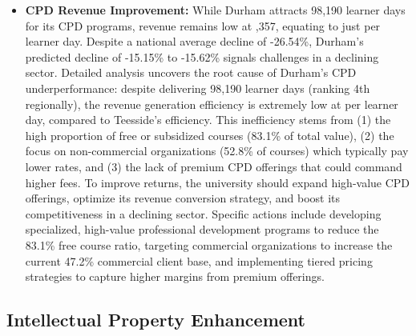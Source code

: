 \documentclass[journal,onecolumn, 10pt,draftclsnofoot]{IEEEtran}
\begin{document}
\begin{itemize}
    \item \textbf{CPD Revenue Improvement:} While Durham attracts 98,190 learner days for its CPD programs, revenue remains low at ,357, equating to just  per learner day. Despite a national average decline of -26.54\%, Durham's predicted decline of -15.15\% to -15.62\% signals challenges in a declining sector. Detailed analysis uncovers the root cause of Durham's CPD underperformance: despite delivering 98,190 learner days (ranking 4th regionally), the revenue generation efficiency is extremely low at  per learner day, compared to Teesside's  efficiency. This inefficiency stems from (1) the high proportion of free or subsidized courses (83.1\% of total value), (2) the focus on non-commercial organizations (52.8\% of courses) which typically pay lower rates, and (3) the lack of premium CPD offerings that could command higher fees. To improve returns, the university should expand high-value CPD offerings, optimize its revenue conversion strategy, and boost its competitiveness in a declining sector. Specific actions include developing specialized, high-value professional development programs to reduce the 83.1\% free course ratio, targeting commercial organizations to increase the current 47.2\% commercial client base, and implementing tiered pricing strategies to capture higher margins from premium offerings.
\end{itemize}

\subsection{Intellectual Property Enhancement}
\end{document}
